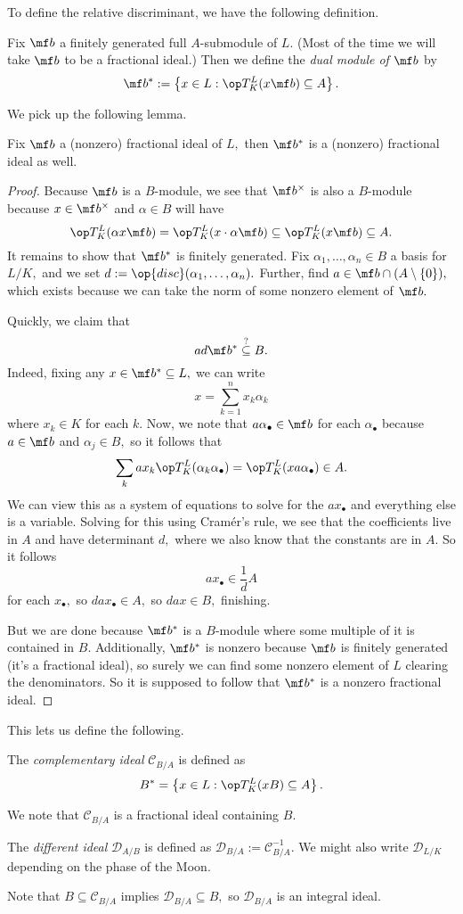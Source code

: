 To define the relative discriminant, we have the following definition.
\begin{definition}
	Fix $\mf b$ a finitely generated full $A$-submodule of $L.$ (Most of the time we will take $\mf b$ to be a fractional ideal.) Then we define the \textit{dual module of $\mf b$} by
	\[\mf b^*:=\left\{x\in L:\op T^L_K(x\mf b)\subseteq A\right\}.\]
\end{definition}
We pick up the following lemma.
\begin{lemma}
	Fix $\mf b$ a (nonzero) fractional ideal of $L,$ then $\mf b^*$ is a (nonzero) fractional ideal as well.
\end{lemma}
\begin{proof}
	Because $\mf b$ is a $B$-module, we see that $\mf b^\times$ is also a $B$-module because $x\in\mf b^\times$ and $\alpha\in B$ will have
	\[\op T^L_K(\alpha x\mf b)=\op T^L_K(x\cdot\alpha\mf b)\subseteq\op T^L_K(x\mf b)\subseteq A.\]
	It remains to show that $\mf b^*$ is finitely generated. Fix $\alpha_1,\ldots,\alpha_n\in B$ a basis for $L/K,$ and we set $d:=\op{disc}(\alpha_1,\ldots,\alpha_n).$ Further, find $a\in\mf b\cap(A\setminus\{0\}),$ which exists because we can take the norm of some nonzero element of $\mf b.$

	Quickly, we claim that
	\[ad\mf b^*\stackrel?\subseteq B.\]
	Indeed, fixing any $x\in\mf b^*\subseteq L,$ we can write
	\[x=\sum_{k=1}^nx_k\alpha_k\]
	where $x_k\in K$ for each $k.$ Now, we note that $a\alpha_\bullet\in\mf b$ for each $\alpha_\bullet$ because $a\in\mf b$ and $\alpha_j\in B,$ so it follows that
	\[\sum_kax_k\op T^L_K(\alpha_k\alpha_\bullet)=\op T^L_K(xa\alpha_\bullet)\in A.\]
	We can view this as a system of equations to solve for the $ax_\bullet$ and everything else is a variable. Solving for this using Cram\'er's rule, we see that the coefficients live in $A$ and have determinant $d,$ where we also know that the constants are in $A.$ So it follows
	\[ax_\bullet\in\frac1dA\]
	for each $x_\bullet,$ so $dax_\bullet\in A,$ so $dax\in B,$ finishing.

	But we are done because $\mf b^*$ is a $B$-module where some multiple of it is contained in $B.$ Additionally, $\mf b^*$ is nonzero because $\mf b$ is finitely generated (it's a fractional ideal), so surely we can find some nonzero element of $L$ clearing the denominators. So it is supposed to follow that $\mf b^*$ is a nonzero fractional ideal.
\end{proof}
This lets us define the following.
\begin{definition}
	The \textit{complementary ideal} $\mathcal C_{B/A}$ is defined as
	\[B^*=\left\{x\in L:\op T_K^L(xB)\subseteq A\right\}.\]
\end{definition}
We note that $\mathcal C_{B/A}$ is a fractional ideal containing $B.$
\begin{definition}
	The \textit{different ideal} $\mathcal D_{A/B}$ is defined as $\mathcal D_{B/A}:=\mathcal C_{B/A}^{-1}.$ We might also write $\mathcal D_{L/K}$ depending on the phase of the Moon.
\end{definition}
Note that $B\subseteq\mathcal C_{B/A}$ implies $\mathcal D_{B/A}\subseteq B,$ so $\mathcal D_{B/A}$ is an integral ideal.

